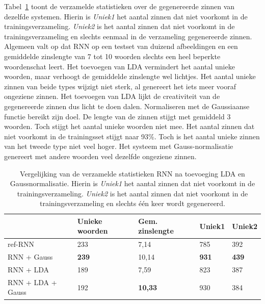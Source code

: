 Tabel~\ref{table:rnn_lda_stats} toont de verzamelde statistieken over de gegenereerde zinnen van dezelfde systemen. Hierin is \emph{Uniek1} het aantal zinnen dat niet voorkomt in de trainingsverzameling. \emph{Uniek2} is het aantal zinnen dat niet voorkomt in de trainingsverzameling en slechts eenmaal in de verzameling gegenereerde zinnen.
Algemeen valt op dat RNN op een testset van duizend afbeeldingen en een gemiddelde zinslengte van 7 tot 10 woorden slechts een heel beperkte woordenschat leert.
Het toevoegen van LDA vermindert het aantal unieke woorden, maar verhoogt de gemiddelde zinslengte wel lichtjes. Het aantal unieke zinnen van beide types wijzigt niet sterk, al genereert het iets meer vooraf ongeziene zinnen. Het toevoegen van LDA lijkt de creativiteit van de gegenereerde zinnen dus licht te doen dalen.
Normaliseren met de Gaussiaanse functie bereikt zijn doel. De lengte van de zinnen stijgt met gemiddeld 3 woorden. Toch stijgt het aantal unieke woorden niet mee. Het aantal zinnen dat niet voorkomt in de trainingsset stijgt naar 93\%. Toch is het aantal unieke zinnen van het tweede type niet veel hoger. Het systeem met Gauss-normalisatie genereert met andere woorden veel dezelfde ongeziene zinnen.

\begin{table}
	\centering
	\begin{tabular}{lllll}
		~                 & Unieke woorden & Gem. zinslengte & Uniek1 & Uniek2 \\ \hline
		ref-RNN           & 233            & 7,14           & 785    & 392    \\
		RNN + Gauss       & \textbf{239}   & 10,14          & \textbf{931}    & \textbf{439}    \\
		RNN + LDA         & 189            & 7,59           & 823    & 387    \\
		RNN + LDA + Gauss & 192            & \textbf{10,33}          & 930    & 384    \\\hline
	\end{tabular}
	\caption[Vergelijking van de verzamelde statistieken RNN na toevoeging LDA en Gaussnormalisatie]{Vergelijking van de verzamelde statistieken RNN na toevoeging LDA en Gaussnormalisatie. Hierin is \emph{Uniek1} het aantal zinnen dat niet voorkomt in de trainingsverzameling. \emph{Uniek2} is het aantal zinnen dat niet voorkomt in de trainingsverzameling en slechts \'e\'en keer wordt gegenereerd.}
	\label{table:rnn_lda_stats}
\end{table}

